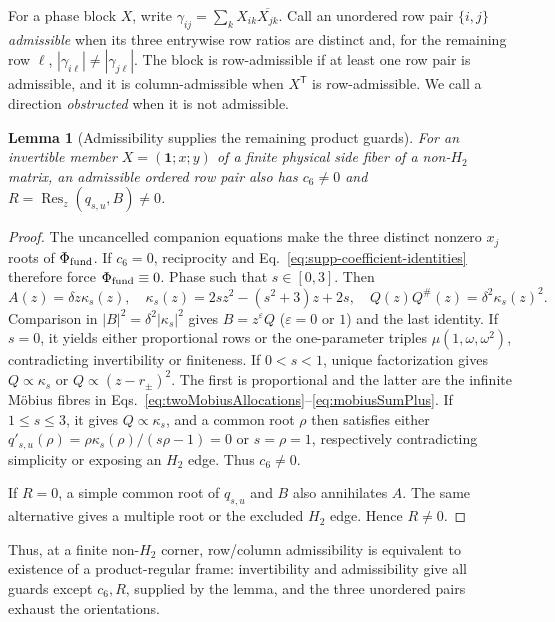 \documentclass[aps,prx,reprint,nofootinbib,twoside,superscriptaddress,longbibliography,floatfix]{revtex4-2}
\newtheorem{lemma}[theorem]{Lemma}
\theoremstyle{definition}
\begin{document}
{For a phase block $X$, write $\gamma_{ij}=\sum_kX_{ik}\overline{X_{jk}}$. Call an unordered row pair $\{i,j\}$ \emph{admissible} when its three entrywise row ratios are distinct and, for the remaining row $\ell$, $|\gamma_{i\ell}|\ne|\gamma_{j\ell}|$. The block is row-admissible if at least one row pair is admissible, and it is column-admissible when $X^{\mathsf T}$ is row-admissible. We call a direction \emph{obstructed} when it is not admissible.}

\begin{lemma}[{Admissibility supplies the remaining product guards}]
\label{lem:supp-admissibility-guards}
{For an invertible member $X=(\mathbf1;x;y)$ of a finite physical side fiber of a non-$H_2$ matrix, an admissible ordered row pair also has $c_6\ne0$ and $R=\operatorname{Res}_z(q_{s,u},B)\ne0$.}
\end{lemma}

\begin{proof}
{The uncancelled companion equations make the three distinct nonzero $x_j$ roots of $\Phi_{\rm fund}$.  If $c_6=0$, reciprocity and Eq.~\eqref{eq:supp-coefficient-identities} therefore force $\Phi_{\rm fund}\equiv0$. Phase such that $s\in[0,3]$. Then}
\begin{equation}
{A(z)=\delta z\kappa_s(z),\quad
\kappa_s(z)=2sz^2-(s^2+3)z+2s,\quad
Q(z)Q^\#(z)=\delta^2\kappa_s(z)^2.}
\label{eq:supp-admissibility-kappa}
\end{equation}
{Comparison in $|B|^2=\delta^2|\kappa_s|^2$ gives $B=z^\varepsilon Q$ ($\varepsilon=0$ or $1$) and the last identity.  If $s=0$, it yields either proportional rows or the one-parameter triples $\mu(1,\omega,\omega^2)$, contradicting invertibility or finiteness.  If $0<s<1$, unique factorization gives $Q\propto\kappa_s$ or $Q\propto(z-r_\pm)^2$. The first is proportional and the latter are the infinite M\"obius fibres in Eqs.~\eqref{eq:twoMobiusAllocations}--\eqref{eq:mobiusSumPlus}.  If $1\le s\le3$, it gives $Q\propto\kappa_s$, and a common root $\rho$ then satisfies either $q'_{s,u}(\rho)=\rho\kappa_s(\rho)/(s\rho-1)=0$ or $s=\rho=1$, respectively contradicting simplicity or exposing an $H_2$ edge. Thus $c_6\ne0$.}

{If $R=0$, a simple common root of $q_{s,u}$ and $B$ also annihilates $A$. The same alternative gives a multiple root or the excluded $H_2$ edge. Hence $R\ne0$.}
\end{proof}

{Thus, at a finite non-$H_2$ corner, row/column admissibility is equivalent to existence of a product-regular frame: invertibility and admissibility give all guards except $c_6,R$, supplied by the lemma, and the three unordered pairs exhaust the orientations.}
\end{document}
